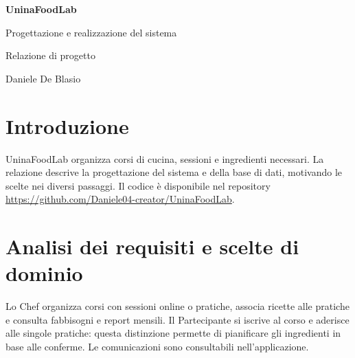 \documentclass[11pt,a4paper]{article}
\begin{document}

\hypersetup{pageanchor=false}\begin{titlepage}\centering\vspace*{26mm}
{\Huge\bfseries\color{ink}UninaFoodLab\par}\vspace{9mm}
{\Large Progettazione e realizzazione del sistema\par}\vspace{5mm}
{\large Relazione di progetto\par}\vfill
{\large Daniele De Blasio\par}\vspace{5mm}
\end{titlepage}
\hypersetup{pageanchor=true}\tableofcontents\clearpage{}
\section{Introduzione}
UninaFoodLab organizza corsi di cucina, sessioni e ingredienti necessari. La relazione descrive la progettazione del sistema e della base di dati, motivando le scelte nei diversi passaggi. Il codice è disponibile nel repository \url{https://github.com/Daniele04-creator/UninaFoodLab}.

\section{Analisi dei requisiti e scelte di dominio}

Lo Chef organizza corsi con sessioni online o pratiche, associa ricette alle pratiche e consulta fabbisogni e report mensili. Il Partecipante si iscrive al corso e aderisce alle singole pratiche: questa distinzione permette di pianificare gli ingredienti in base alle conferme. Le comunicazioni sono consultabili nell'applicazione.
\end{document}
